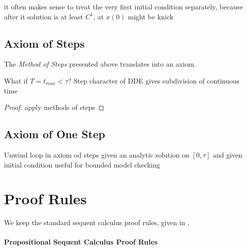 \documentclass[10pt]{report}
\begin{document}
it often makes sense to treat the very first initial condition separately, because after it solution is at least $C^1$, at $x(0)$ might be knick

    \subsection{Axiom of Steps}
        \label{sec:axiom-of-steps}

        The \emph{Method of Steps} presented above translates into an axiom.

        \begin{calculus}


        \end{calculus}

        What if $T=t_{max} < \tau$?
        Step character of DDE gives subdivision of continuous time

        \begin{proof}
            apply methods of steps
        \end{proof}

    \subsection{Axiom of One Step}
        \label{sex:axiom-of-one-step}

        Unwind loop in axiom od steps
        given an analytic solution on $[0,\tau]$ and given initial condition
        useful for bounded model checking

\section{Proof Rules}
    \label{sec:proof-rules}

    We keep the standard sequent calculus proof rules, given in \dL.

    \paragraph{Propositional Sequent Calculus Proof Rules}
        \label{sec:propositional-rules}
\end{document}

